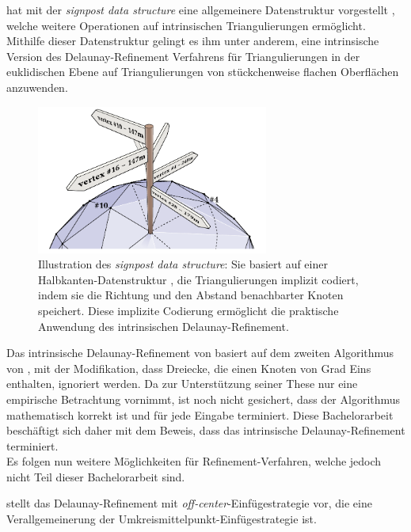 \citet{Sharp:2019:NIT} hat mit der \textit{signpost data structure} eine allgemeinere Datenstruktur vorgestellt \cite[abschnitt 3]{Sharp:2019:NIT}, welche weitere Operationen auf intrinsischen Triangulierungen ermöglicht. Mithilfe dieser Datenstruktur gelingt es ihm unter anderem, eine intrinsische Version des Delaunay-Refinement Verfahrens für Triangulierungen in der euklidischen Ebene auf Triangulierungen von stückchenweise flachen Oberflächen \cite[Definition 1]{Bobenko:2007:LaplaceBeltrami} anzuwenden. 
 \begin{figure}[h]%
    \centering
  \includegraphics[width=3in]{images/signpostDataStructure.png}
  \caption{Illustration des \textit{signpost data structure}: Sie basiert auf einer Halbkanten-Datenstruktur \cite{mantyla:1987:halfedge}, die  Triangulierungen implizit codiert, indem sie die Richtung und den Abstand benachbarter Knoten speichert. Diese implizite Codierung ermöglicht die praktische Anwendung des intrinsischen Delaunay-Refinement.  \cite{Bobenko:2006:SIGGRAPH}}
\end{figure}
Das intrinsische Delaunay-Refinement von \citeauthor{Sharp:2019:NIT} basiert auf dem zweiten Algorithmus von \citet{chew:1993:guaranteed}, mit der Modifikation, dass Dreiecke, die einen Knoten von Grad Eins enthalten, ignoriert werden. 
Da \cite{Sharp:2019:NIT} zur Unterstützung seiner These nur eine empirische Betrachtung vornimmt, ist noch nicht gesichert, dass der Algorithmus mathematisch korrekt ist und für jede Eingabe terminiert. Diese Bachelorarbeit beschäftigt sich daher mit dem Beweis, dass das intrinsische Delaunay-Refinement terminiert.\\

Es folgen nun weitere Möglichkeiten für Refinement-Verfahren, welche jedoch nicht Teil dieser Bachelorarbeit sind.

\citet{ungoe:2004:off-center} stellt das Delaunay-Refinement mit \textit{off-center}-Einfügestrategie vor, die eine Verallgemeinerung der Umkreismittelpunkt-Einfügestrategie ist.

